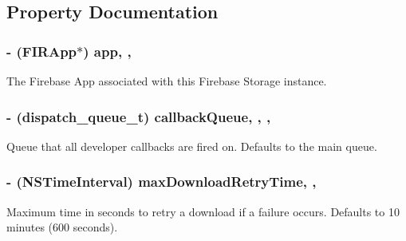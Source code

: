 \subsection{Property Documentation}
\hypertarget{interface_f_i_r_storage_acb8f251a84f7adf957795b1305350025}{}
\subsubsection[{app}]{\setlength{\rightskip}{0pt plus 5cm}-\/ ({\bf F\+I\+R\+App}$\ast$) app\hspace{0.3cm}{\ttfamily [read]}, {\ttfamily [nonatomic]}, {\ttfamily [strong]}}\label{interface_f_i_r_storage_acb8f251a84f7adf957795b1305350025}
The Firebase App associated with this Firebase Storage instance. \hypertarget{interface_f_i_r_storage_a96538feb8fc023d6771f6ce2b614eee5}{}
\subsubsection[{callback\+Queue}]{\setlength{\rightskip}{0pt plus 5cm}-\/ (dispatch\+\_\+queue\+\_\+t) callback\+Queue\hspace{0.3cm}{\ttfamily [read]}, {\ttfamily [write]}, {\ttfamily [nonatomic]}, {\ttfamily [strong]}}\label{interface_f_i_r_storage_a96538feb8fc023d6771f6ce2b614eee5}
Queue that all developer callbacks are fired on. Defaults to the main queue. \hypertarget{interface_f_i_r_storage_aceb260f6e31d980386560e46c0903772}{}
\subsubsection[{max\+Download\+Retry\+Time}]{\setlength{\rightskip}{0pt plus 5cm}-\/ (N\+S\+Time\+Interval) max\+Download\+Retry\+Time\hspace{0.3cm}{\ttfamily [read]}, {\ttfamily [write]}, {\ttfamily [atomic]}}\label{interface_f_i_r_storage_aceb260f6e31d980386560e46c0903772}
Maximum time in seconds to retry a download if a failure occurs. Defaults to 10 minutes (600 seconds). \hypertarget{interface_f_i_r_storage_a197aa620f2ba27a1c898e6c77b791f0f}{}
